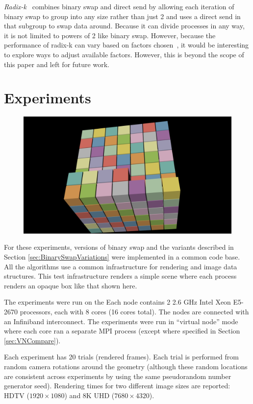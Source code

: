 \documentclass{vgtc}                          %
\newcommand*{\lcite}[1]{~\cite{#1}}
\newcommand*{\keyterm}[1]{\emph{#1}}
\newcommand*{\redact}[1]{\textsc{[#1]}}
\begin{document}
\keyterm{Radix-k}\lcite{RadixK} combines binary swap and direct send by allowing each iteration of binary swap to group into any size rather than just 2 and uses a direct send in that subgroup to swap data around.
Because it can divide processes in any way, it is not limited to powers of 2 like binary swap.
However, because the performance of radix-k can vary based on factors chosen\lcite{Kendall2010,Moreland2011:SC}, it would be interesting to explore ways to adjust available factors.
However, this is beyond the scope of this paper and left for future work.

\section{Experiments}
\label{sec:Results}

\begin{figure}
  \includegraphics[width=.5\linewidth]{render-example-hdtv}
\end{figure}
For these experiments, versions of binary swap and the variants described in Section \ref{sec:BinarySwapVariations} were implemented in a common code base.
All the algorithms use a common infrastructure for rendering and image data structures.
This test infrastructure renders a simple scene where each process renders an opaque box like that shown here.

The experiments were run on the
\iftoggle{anonymous}{
  \redact{cluster name removed for anonymous review}.
}{
  Sky Bridge cluster at Sandia National Laboratories\lcite{SkyBridge}.
  Sky Bridge is a water cooled Cray capacity cluster with 1,848 nodes (although at most 512 nodes were used at any one time during these experiments).
}
Each node contains 2 2.6 GHz Intel Xeon E5-2670 processors, each with 8 cores (16 cores total).
The nodes are connected with an Infiniband interconnect.
The experiments were run in ``virtual node'' mode where each core ran a separate MPI process (except where specified in Section \ref{sec:VNCompare}).

Each experiment has 20 trials (rendered frames).
Each trial is performed from random camera rotations around the geometry (although these random locations are consistent across experiments by using the same pseudorandom number generator seed).
Rendering times for two different image sizes are reported: HDTV ($1920 \times 1080$) and 8K UHD ($7680 \times 4320$).
\end{document}
